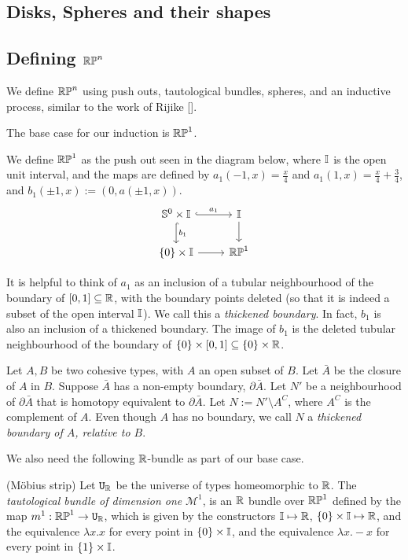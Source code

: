 \documentclass{amsart}
\begin{document}
\subsection{Disks, Spheres and their shapes}
\subsection{Defining $\mathbb{RP}^n$}
We define $\mathbb{RP}^n$ using push outs, tautological bundles, spheres, and an inductive process, similar to the work of Rijike [].

The base case for our induction is $\mathbb{RP}^1$.

\begin{definition}
We define $\mathbb{RP}^1$ as the push out seen in the diagram below, where $\mathbb{I}$ is the open unit interval, and the maps are defined by $a_1(-1,x) = \frac{x}{4}$ and $a_1(1,x)= \frac{x}{4} + \frac{3}{4}$, and $b_1 (\pm 1, x) := (0, a(\pm1, x))$.\\
\[\begin{tikzcd}
\set{S}^0 \times \set{I} \arrow[r, hook, "a_1"] \arrow[d, hook, "b_1" ] & \set{I} \arrow[d]\\
\{0 \} \times \set{I} \arrow[r] & \set{RP}^1
\end{tikzcd}
\]
\end{definition}

It is helpful to think of $a_1$ as an inclusion of a tubular neighbourhood of the boundary of $[0,1] \subseteq \mathbb{R}$, with the boundary points deleted (so that it is indeed a subset of the open interval $\mathbb{I}$). We call this a \emph{thickened boundary}. In fact, $b_1$ is also an inclusion of a thickened boundary. The image of $b_1$ is the deleted tubular neighbourhood of the boundary of $\{0\} \times [0,1] \subseteq \{0\} \times \mathbb{R}$.

\begin{definition}
Let $A, B$ be two cohesive types, with $A$ an open subset of $B$. Let $\bar{A}$ be the closure of $A$ in $B$. Suppose $\bar{A}$ has a non-empty boundary, $\partial \bar{A}$. Let $N'$ be a neighbourhood of $\partial\bar{A}$ that is homotopy equivalent to $\partial\bar{A}$. Let $N := N' \setminus A^C$, where $A^C$ is the complement of $A$. Even though $A$ has no boundary, we call $N$ a \emph{thickened boundary of $A$, relative to $B$}.
\end{definition}

We also need the following $\mathbb{R}$-bundle as part of our base case. 
\begin{definition}(M\"{o}bius strip)
Let $\mathtt{U}_{\mathbb{R}}$ be the universe of types homeomorphic to $\mathbb{R}$. The \emph{tautological bundle of dimension one} $\mathcal{M}^1$, is an $\mathbb{R}$ bundle over $\mathbb{RP}^1$ defined by the map $m^1: \mathbb{RP}^1 \rightarrow \mathtt{U}_{\mathbb{R}}$, which is given by the constructors $\mathbb{I} \mapsto \mathbb{R}$, $\{0 \} \times \mathbb{I} \mapsto \mathbb{R}$, and the equivalence $\lambda x. x$ for every point in $\{0\} \times \mathbb{I}$, and the equivalence $\lambda x. -x$ for every point in $\{1\} \times \mathbb{I}$.
\end{definition}
\end{document}
